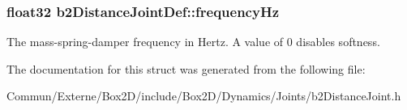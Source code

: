 \subsubsection[{\texorpdfstring{frequency\+Hz}{frequencyHz}}]{\setlength{\rightskip}{0pt plus 5cm}float32 b2\+Distance\+Joint\+Def\+::frequency\+Hz}\hypertarget{structb2_distance_joint_def_a35e2362bcb6c58734f95d0ac045863ea}{}\label{structb2_distance_joint_def_a35e2362bcb6c58734f95d0ac045863ea}
The mass-\/spring-\/damper frequency in Hertz. A value of 0 disables softness. 

The documentation for this struct was generated from the following file\+:\begin{DoxyCompactItemize}
\item 
Commun/\+Externe/\+Box2\+D/include/\+Box2\+D/\+Dynamics/\+Joints/b2\+Distance\+Joint.\+h\end{DoxyCompactItemize}
